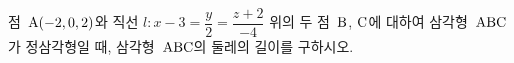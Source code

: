 점~$\mathrm{A}(-2{,}\mkern3mu\mathopen{}0{,}\mkern3mu\mathopen{}2)$와 직선 $l\colon x-3=\dfrac{y}{2}=\dfrac{z+2}{-4}$ 위의 두 점~$\mathrm{B}$, $\mathrm{C}$에 대하여 삼각형~$\mathrm{ABC}$가 정삼각형일 때, 삼각형~$\mathrm{ABC}$의 둘레의 길이를 구하시오.
